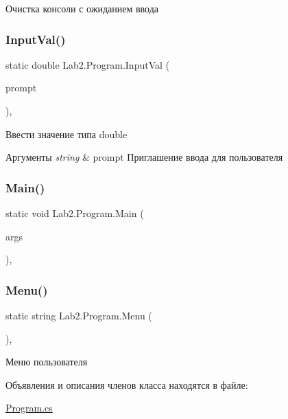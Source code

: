 Очистка консоли с ожиданием ввода \mbox{\label{class_lab2_1_1_program_ad2d2274d45b38fc9290361216486e80e}} 
\subsubsection{\texorpdfstring{Input\+Val()}{InputVal()}}
{\footnotesize\ttfamily static double Lab2.\+Program.\+Input\+Val (\begin{DoxyParamCaption}\item[{string}]{prompt }\end{DoxyParamCaption})\hspace{0.3cm}{\ttfamily [static]}, {\ttfamily [private]}}

Ввести значение типа double 
\begin{DoxyParams}{Аргументы}
{\em string} & prompt Приглашение ввода для пользователя \\
\hline
\end{DoxyParams}
\mbox{\label{class_lab2_1_1_program_a27a77b796d70d0e23c1a5d7db283b845}} 
\subsubsection{\texorpdfstring{Main()}{Main()}}
{\footnotesize\ttfamily static void Lab2.\+Program.\+Main (\begin{DoxyParamCaption}\item[{string \mbox{[}$\,$\mbox{]}}]{args }\end{DoxyParamCaption})\hspace{0.3cm}{\ttfamily [static]}, {\ttfamily [private]}}

\mbox{\label{class_lab2_1_1_program_af02bc1eac4648c46552fb6f266310e2e}} 
\subsubsection{\texorpdfstring{Menu()}{Menu()}}
{\footnotesize\ttfamily static string Lab2.\+Program.\+Menu (\begin{DoxyParamCaption}{ }\end{DoxyParamCaption})\hspace{0.3cm}{\ttfamily [static]}, {\ttfamily [private]}}

Меню пользователя 

Объявления и описания членов класса находятся в файле\+:\begin{DoxyCompactItemize}
\item 
\hyperlink{_program_8cs}{Program.\+cs}\end{DoxyCompactItemize}
